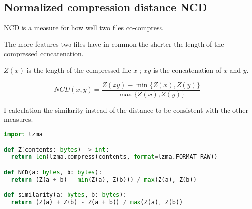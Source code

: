 \documentclass[../main.tex]{subfiles}
\begin{document}
\subsection{Normalized compression distance NCD}

NCD is a measure for how well two files co-compress.

The more features two files have in common the shorter the length of the compressed concatenation.

$Z(x)$ is the length of the compressed file $x$ ; $xy$ is the concatenation of $x$ and $y$.

\begin{equation}
  NCD(x,y) = \dfrac{Z(xy) - \min \{Z(x),Z(y)\}}{\max \{Z(x),Z(y)\}}
\end{equation}

I calculation the similarity instead of the distance to be consistent with the other measures.

\begin{lstlisting}[basicstyle=\ttfamily,language=Python]
import lzma

def Z(contents: bytes) -> int:
  return len(lzma.compress(contents, format=lzma.FORMAT_RAW))

def NCD(a: bytes, b: bytes):
  return (Z(a + b) - min(Z(a), Z(b))) / max(Z(a), Z(b))

def similarity(a: bytes, b: bytes):
  return (Z(a) + Z(b) - Z(a + b)) / max(Z(a), Z(b))
\end{lstlisting}
\end{document}
